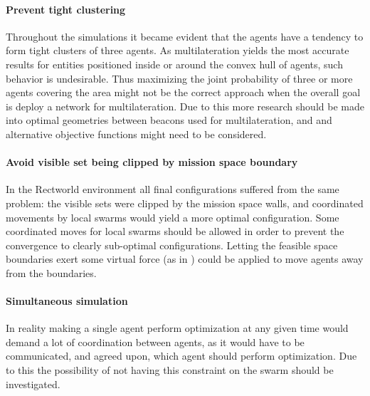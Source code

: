 \paragraph{Prevent tight clustering}
Throughout the simulations it became evident that the agents have a tendency to form tight clusters of three agents.
As multilateration yields the most accurate results for entities positioned inside or around the convex hull of agents,
such behavior is undesirable. Thus maximizing the joint probability of three or more agents covering the area might not be the 
correct approach when the overall goal is deploy a network for multilateration. Due to this more research should be made into
optimal geometries between beacons used for multilateration, and and alternative objective functions might need to be considered.

\paragraph{Avoid visible set being clipped by mission space boundary}
In the Rectworld environment all final configurations suffered from the same problem: the visible sets were clipped by the mission
space walls, and coordinated movements by local swarms would yield a more optimal configuration. 
Some coordinated moves for local swarms should be allowed in order to prevent the convergence to 
clearly sub-optimal configurations. Letting the feasible space boundaries exert some virtual force (as in \cite{pot_field}) could be 
applied to move agents away from the boundaries.

\paragraph{Simultaneous simulation} In reality making a single agent perform optimization at any given time would demand
a lot of coordination between agents, as it would have to be communicated, and agreed upon, which agent should perform optimization.
Due to this the possibility of not having this constraint on the swarm should be investigated.